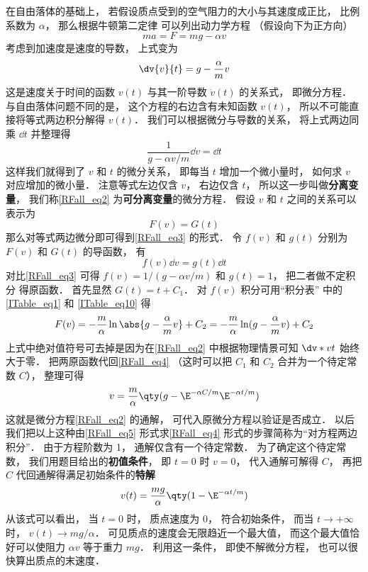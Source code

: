

在自由落体的基础上， 若假设质点受到的空气阻力的大小与其速度成正比， 比例系数为 $\alpha$， 那么根据牛顿第二定律 可以列出动力学方程 （假设向下为正方向）
\begin{equation}
ma = F = mg - \alpha v
\end{equation}
考虑到加速度是速度的导数， 上式变为
\begin{equation}\label{RFall_eq2}
\dv{v}{t} = g - \frac{\alpha}{m} v
\end{equation}
这是速度关于时间的函数 $v(t)$ 与其一阶导数 $\dot v(t)$ 的关系式， 即微分方程． 与自由落体问题不同的是， 这个方程的右边含有未知函数 $v(t)$， 所以不可能直接将等式两边积分解得 $v(t)$． 我们可以根据微分与导数的关系， 将上式两边同乘 $\dd{t}$ 并整理得
\begin{equation}\label{RFall_eq3}
\frac{1}{g - \alpha v/m} \dd{v} = \dd{t}
\end{equation}
这样我们就得到了 $v$ 和 $t$ 的微分关系， 即每当 $t$ 增加一个微小量时， 如何求 $v$ 对应增加的微小量． 注意等式左边仅含 $v$， 右边仅含 $t$， 所以这一步叫做\textbf{分离变量}， 我们称\autoref{RFall_eq2} 为\textbf{可分离变量}的微分方程． 假设 $v$ 和 $t$ 之间的关系可以表示为
\begin{equation}\label{RFall_eq4}
F(v) = G(t)
\end{equation}
那么对等式两边微分即可得到\autoref{RFall_eq3} 的形式． 令 $f(v)$ 和 $g(t)$ 分别为 $F(v)$ 和 $G(t)$ 的导函数， 有
\begin{equation}\label{RFall_eq5}
f(v) \dd{v} = g(t) \dd{t}
\end{equation}
对比\autoref{RFall_eq3} 可得 $f(v) = 1/(g - \alpha v/m)$ 和 $g(t) = 1$， 把二者做不定积分 得原函数． 首先显然 $G(t) = t + C_1$． 对 $f(v)$ 积分可用“积分表” 中的\autoref{ITable_eq1} 和 \autoref{ITable_eq10} 得
\begin{equation}
F(v) = -\frac{m}{\alpha} \ln\abs{g - \frac{\alpha}{m} v} + C_2 = -\frac{m}{\alpha} \ln(g - \frac{\alpha}{m} v) + C_2
\end{equation}
 上式中绝对值符号可去掉是因为在\autoref{RFall_eq2} 中根据物理情景可知 $\dv*{v}{t}$ 始终大于零． 把两原函数代回\autoref{RFall_eq4} （这时可以把 $C_1$ 和 $C_2$ 合并为一个待定常数 $C$）， 整理可得
\begin{equation}
v = \frac{m}{\alpha} \qty( g - \E^{-\alpha C/m} \E^{-\alpha t/m} )
\end{equation}
这就是微分方程\autoref{RFall_eq2} 的通解， 可代入原微分方程以验证是否成立． 以后我们把以上这种由\autoref{RFall_eq5} 形式求\autoref{RFall_eq4} 形式的步骤简称为“对方程两边积分”． 由于方程阶数为 1， 通解仅含有一个待定常数． 为了确定这个待定常数， 我们用题目给出的\textbf{初值条件}， 即 $t = 0$ 时 $v = 0$， 代入通解可解得 $C$， 再把 $C$ 代回通解得满足初始条件的\textbf{特解}
\begin{equation}
v(t) = \frac{mg}{\alpha} \qty( 1- \E^{-\alpha t/m} )
\end{equation}
从该式可以看出， 当 $t = 0$ 时， 质点速度为 0， 符合初始条件， 而当 $t\to +\infty$ 时， $ v(t) \to mg/\alpha$． 可见质点的速度会无限趋近一个最大值， 而这个最大值恰好可以使阻力 $\alpha v$ 等于重力 $mg$． 利用这一条件， 即使不解微分方程， 也可以很快算出质点的末速度．

